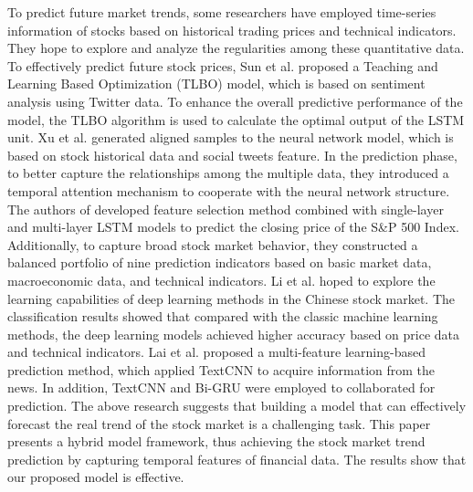 \documentclass[sn-mathphys]{sn-jnl}%
\theoremstyle{thmstyleone}%
\theoremstyle{thmstyletwo}%
\theoremstyle{thmstylethree}%
\begin{document}
To predict future market trends, some researchers have employed time-series information of stocks based on historical trading prices and technical indicators. They hope to explore and analyze the regularities among these quantitative data\cite{RN169,RN150,RN151}. To effectively predict future stock prices, Sun et al.\cite{RN204} proposed a Teaching and Learning Based Optimization (TLBO) model, which is based on sentiment analysis using Twitter data. To enhance the overall predictive performance of the model, the TLBO algorithm is used to calculate the optimal output of the LSTM unit. Xu et al.\cite{RN186} generated aligned samples to the neural network model, which is based on stock historical data and social tweets feature. In the prediction phase, to better capture the relationships among the multiple data, they introduced a temporal attention mechanism to cooperate with the neural network structure. The authors of \cite{RN201} developed feature selection method combined with single-layer and multi-layer LSTM models to predict the closing price of the S\&P 500 Index. Additionally, to capture broad stock market behavior, they constructed a balanced portfolio of nine prediction indicators based on basic market data, macroeconomic data, and technical indicators. Li et al. \cite{RN187} hoped to explore the learning capabilities of deep learning methods in the Chinese stock market. The classification results showed that compared with the classic machine learning methods, the deep learning models achieved higher accuracy based on price data and technical indicators. Lai et al. \cite{RN149} proposed a multi-feature learning-based prediction method, which applied TextCNN to acquire information from the news. In addition, TextCNN and Bi-GRU were employed to collaborated for prediction. The above research suggests that building a model that can effectively forecast the real trend of the stock market is a challenging task. This paper presents a hybrid model framework, thus achieving the stock market trend prediction by capturing temporal features of financial data. The results show that our proposed model is effective.
\end{document}
